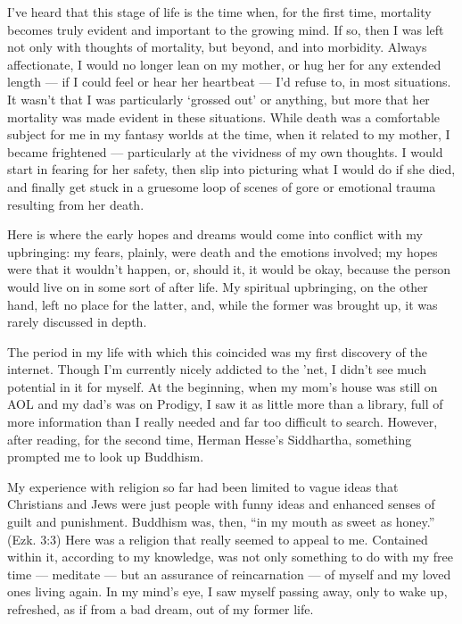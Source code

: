 \documentclass{book}
\begin{document}
I've heard that this stage of life is the time when, for the first time, mortality becomes truly evident and important to the growing mind.  If so, then I was left not only with thoughts of mortality, but beyond, and into morbidity.  Always affectionate, I would no longer lean on my mother, or hug her for any extended length --- if I could feel or hear her heartbeat --- I'd refuse to, in most situations.  It wasn't that I was particularly `grossed out' or anything, but more that her mortality was made evident in these situations.  While death was a comfortable subject for me in my fantasy worlds at the time, when it related to my mother, I became frightened --- particularly at the vividness of my own thoughts.  I would start in fearing for her safety, then slip into picturing what I would do if she died, and finally get stuck in a gruesome loop of scenes of gore or emotional trauma resulting from her death.

Here is where the early hopes and dreams would come into conflict with my upbringing: my fears, plainly, were death and the emotions involved; my hopes were that it wouldn't happen, or, should it, it would be okay, because the person would live on in some sort of after life.  My spiritual upbringing, on the other hand, left no place for the latter, and, while the former was brought up, it was rarely discussed in depth.

The period in my life with which this coincided was my first discovery of the internet.  Though I'm currently nicely addicted to the 'net, I didn't see much potential in it for myself.  At the beginning, when my mom's house was still on AOL and my dad's was on Prodigy, I saw it as little more than a library, full of more information than I really needed and far too difficult to search.  However, after reading, for the second time, Herman Hesse's Siddhartha, something prompted me to look up Buddhism.

My experience with religion so far had been limited to vague ideas that Christians and Jews were just people with funny ideas and enhanced senses of guilt and punishment.  Buddhism was, then, ``in my mouth as sweet as honey.'' (Ezk.  3:3) Here was a religion that really seemed to appeal to me.  Contained within it, according to my knowledge, was not only something to do with my free time --- meditate --- but an assurance of reincarnation --- of myself and my loved ones living again.  In my mind's eye, I saw myself passing away, only to wake up, refreshed, as if from a bad dream, out of my former life.
\end{document}
